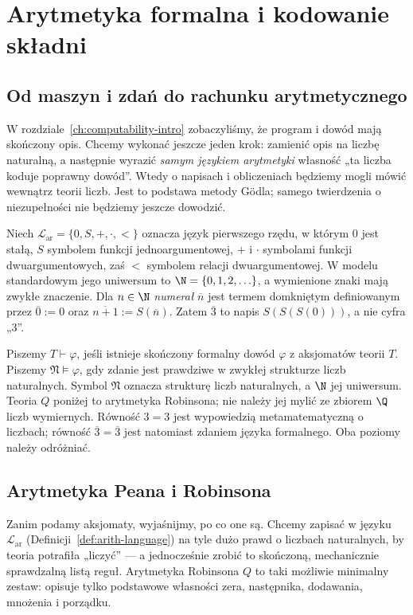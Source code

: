 \chapter{Arytmetyka formalna i kodowanie składni}\label{ch:arithmetization}

\section{Od maszyn i zdań do rachunku arytmetycznego}
W rozdziale~\ref{ch:computability-intro} zobaczyliśmy, że program
i dowód mają skończony opis. Chcemy wykonać jeszcze jeden krok:
zamienić opis na liczbę naturalną, a następnie wyrazić
\emph{samym językiem arytmetyki} własność
„ta liczba koduje poprawny dowód”.
Wtedy o napisach i obliczeniach będziemy mogli mówić wewnątrz
teorii liczb. Jest to podstawa metody Gödla; samego twierdzenia
o niezupełności nie będziemy jeszcze dowodzić.

\begin{definicja}\label{def:arith-language}
Niech $\mathcal L_{\mathrm{ar}}=\{0,S,+,\cdot,<\}$
oznacza język pierwszego rzędu, w którym $0$ jest stałą,
$S$ symbolem funkcji jednoargumentowej, $+$ i $\cdot$
symbolami funkcji dwuargumentowych, zaś $<$ symbolem relacji
dwuargumentowej. W modelu standardowym jego uniwersum to
$\N=\{0,1,2,\ldots\}$, a wymienione znaki mają zwykłe znaczenie.
Dla $n\in\N$ \emph{numerał} $\overline n$ jest termem
domkniętym definiowanym przez
$\overline0:=0$ oraz $\overline{n+1}:=S(\overline n)$.
Zatem $\overline3$ to napis $S(S(S(0)))$, a nie cyfra „3”.
\end{definicja}

\begin{uwaga}\label{rem:arith-meta}
Piszemy $T\vdash\varphi$, jeśli istnieje skończony formalny
dowód $\varphi$ z aksjomatów teorii $T$.
Piszemy $\mathfrak N\models\varphi$, gdy zdanie jest prawdziwe
w zwykłej strukturze liczb naturalnych.
Symbol $\mathfrak N$ oznacza strukturę liczb naturalnych, a $\N$ jej uniwersum.
Teoria $Q$ poniżej to arytmetyka Robinsona; nie należy jej mylić ze zbiorem $\Q$ liczb wymiernych.
Równość $3=3$ jest wypowiedzią metamatematyczną
o liczbach; równość $\overline3=\overline3$ jest natomiast
zdaniem języka formalnego. Oba poziomy należy odróżniać.
\end{uwaga}

\section{Arytmetyka Peana i Robinsona}\label{sec:arytmetyka-peana-robinsona}
Zanim podamy aksjomaty, wyjaśnijmy, po co one są. Chcemy zapisać w języku $\mathcal L_{\mathrm{ar}}$ (Definicji~\ref{def:arith-language}) na tyle dużo prawd o liczbach naturalnych, by teoria potrafiła „liczyć” --- a jednocześnie zrobić to skończoną, mechanicznie sprawdzalną listą reguł. Arytmetyka Robinsona $Q$ to taki możliwie minimalny zestaw: opisuje tylko podstawowe własności zera, następnika, dodawania, mnożenia i porządku.

